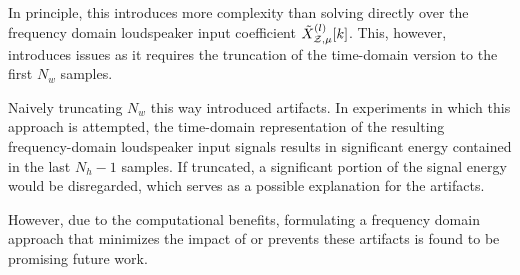 In principle, this introduces more complexity than solving directly over the frequency domain loudspeaker input coefficient
$\tilde{X}^{(l)}_{\mathcal{Z},\mu}[k]$.
This, however, introduces issues as it requires the truncation of the time-domain version to the first $N_w$ samples.

Naively truncating $N_w$ this way introduced artifacts. 
In experiments in which this approach is attempted, the time-domain representation of the resulting frequency-domain loudspeaker input signals results in significant energy contained in the last $N_h - 1$ samples.
If truncated, a significant portion of the signal energy would be disregarded, which serves as a possible explanation for the artifacts.

However, due to the computational benefits, formulating a frequency domain approach that minimizes the impact of or prevents these artifacts is found to be promising future work.
